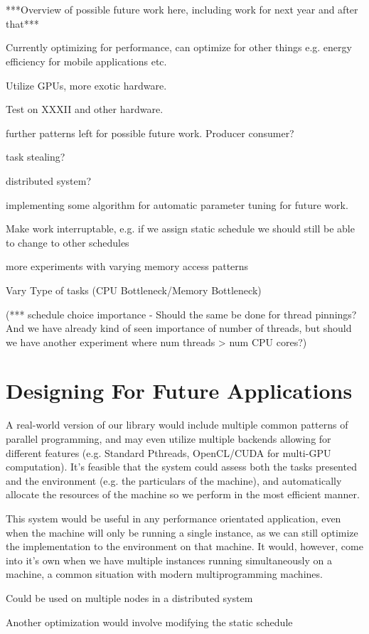 \section{}

***Overview of possible future work here, including work for next year and after that***

Currently optimizing for performance, can  optimize for other things e.g. energy efficiency for mobile applications etc.

Utilize GPUs, more exotic hardware.

Test on XXXII and other hardware.

further patterns left for possible future work. Producer consumer?

task stealing?

distributed system?

implementing some algorithm for automatic parameter tuning for future work.

Make work interruptable, e.g. if we assign static schedule we should still be able to change to other schedules

more experiments with varying memory access patterns

Vary Type of tasks (CPU Bottleneck/Memory Bottleneck) 

(*** schedule choice importance - Should the same be done for thread pinnings? And we have already kind of seen importance of number of threads, but should we have another experiment where num threads > num CPU cores?)

\section{Designing For Future Applications}

A real-world version of our library would include multiple common patterns of parallel programming, and may even utilize multiple backends allowing for different features (e.g. Standard Pthreads, OpenCL/CUDA for multi-GPU computation). It's feasible that the system could assess both the tasks presented and the environment (e.g. the particulars of the machine), and automatically allocate the resources of the machine so we perform in the most efficient manner.

This system would be useful in any performance orientated application, even when the machine will only be running a single instance, as we can still optimize the implementation to the environment on that machine. It would, however, come into it's own when we have multiple instances running simultaneously on a machine, a common situation with modern multiprogramming machines.

Could be used on multiple nodes in a distributed system

Another optimization would involve modifying the static schedule